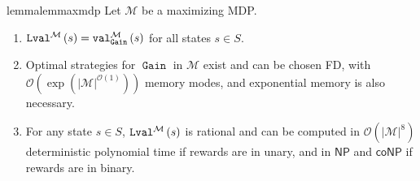 \documentclass[a4paper,UKenglish,cleveref,autoref,thm-restate]{lipics-v2021}
\DeclareMathOperator{\Gain}{\mathtt{Gain}}
\newcommand{\+}[1]{\mathbb{#1}}
\newcommand{\?}[1]{\mathcal{#1}}
\newcommand{\Ocompl}{\?{O}}
\newcommand{\NP}{\ensuremath{\mathsf{NP}}}
\newcommand{\coNP}{\ensuremath{\mathsf{coNP}}}
\newcommand{\mdp}{{\mathcal M}}
\newcommand{\states}{S}
\newcommand{\s}{s}
\begin{document}
\begin{restatable}{lemma}{lemmaxmdp}\label{lem:maxmdp}
  Let $\mdp$ be a maximizing MDP.
  \begin{enumerate}
  \item
    $\limval[\mdp]{\s} = \valueof[\mdp][\Gain]{\s}$ for all states $\s \in \states$.
    \label{lem:maxmdp-1}
  \item
    Optimal strategies for $\Gain$ in $\mdp$ exist and can be chosen FD,
    with $\Ocompl(\exp(|\mdp|^{\Ocompl(1)}))$ memory modes,
    and exponential memory is also necessary.
    \label{lem:maxmdp-2}
  \item
    For any state $\s \in \states$, $\limval[\mdp]{\s}$ is rational and can be computed in
    $\Ocompl(|\mdp|^8)$ deterministic
    polynomial time if rewards are in unary, and in $\NP$ and $\coNP$ if
    rewards are in binary.
    \label{lem:maxmdp-3}
  \end{enumerate}
\end{restatable}
\end{document}
